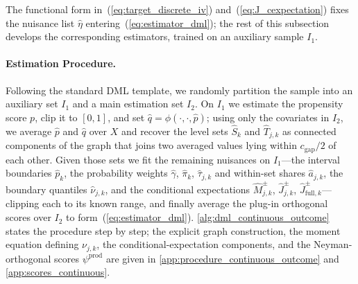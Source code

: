 The functional form in~(\ref{eq:target_discrete_iv}) and~(\ref{eq:J_cexpectation}) fixes the nuisance list $\hat\eta$ entering~(\ref{eq:estimator_dml}); the rest of this subsection develops the corresponding estimators, trained on an auxiliary sample $I_1$.

\paragraph{Estimation Procedure.} Following the standard DML template, we randomly partition the sample into an auxiliary set $I_1$ and a main estimation set $I_2$. On $I_1$ we estimate the propensity score $p$, clip it to $[0,1]$, and set $\hat q=\phi(\cdot,\cdot,\hat p)$; using only the covariates in $I_2$, we average $\hat p$ and $\hat q$ over $X$ and recover the level sets $\widehat S_k$ and $\widehat T_{j,k}$ as connected components of the graph that joins two averaged values lying within $c_{\mathrm{gap}}/2$ of each other. Given those sets we fit the remaining nuisances on $I_1$---the interval boundaries $\hat p_k$, the probability weights $\hat\gamma$, $\hat\pi_k$, $\hat\tau_{j,k}$ and within-set shares $\hat a_{j,k}$, the boundary quantiles $\hat\nu_{j,k}$, and the conditional expectations $\hat M^{\pm}_{j,k}$, $\hat J^{\pm}_{j,k}$, $\hat J^{\pm}_{\mathrm{full},k}$---clipping each to its known range, and finally average the plug-in orthogonal scores over $I_2$ to form~(\ref{eq:estimator_dml}). \cref{alg:dml_continuous_outcome} states the procedure step by step; the explicit graph construction, the moment equation defining $\nu_{j,k}$, the conditional-expectation components, and the Neyman-orthogonal scores $\psi^{\mathrm{prod}}$ are given in \cref{app:procedure_continuous_outcome} and \cref{app:scores_continuous}.

